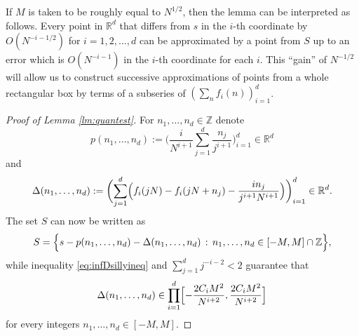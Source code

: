 \documentclass[11pt,letterpaper,reqno]{amsart}
\numberwithin{equation}{section}
\theoremstyle{definition}
\numberwithin{equation}{section}
\begin{document}
If $M$ is taken to be roughly equal to $N^{1/2}$, then the lemma can be interpreted as follows. Every point in $\mathbb{R}^d$ that differs from $s$ in the $i$-th coordinate by $O(N^{-i-1/2})$ for $i=1,2,\ldots,d$ can be approximated by a point from $S$ up to an error which is $O(N^{-i-1})$ in the $i$-th coordinate for each $i$. This ``gain'' of $N^{-1/2}$ will allow us to construct successive approximations of points from a whole rectangular box by terms of a subseries of $(\sum_n f_i(n))_{i=1}^{d}$.

\begin{proof}[Proof of Lemma \ref{lm:quantest}]
For $n_1,\ldots,n_d\in\mathbb{Z}$ denote
\[ p(n_1,\ldots,n_d) := \Big( \frac{i}{N^{i+1}} \sum_{j=1}^{d} \frac{n_j}{j^{i+1}} \Big)_{i=1}^{d} \in \mathbb{R}^d \]
and
\[ \Delta(n_1,\ldots,n_d) := \biggl( \sum_{j=1}^{d} \Bigl( f_i(j N)-f_i(j N + n_j)-\frac{i n_j}{j^{i+1} N^{i+1}} \Bigr) \biggr)_{i=1}^{d} \in \mathbb{R}^d. \]
The set $S$ can now be written as
\[ S = \Bigl\{ s - p(n_1,\ldots,n_d) - \Delta(n_1,\ldots,n_d) \,:\, n_1,\ldots,n_d\in[-M,M]\cap\mathbb{Z} \Bigr\}, \]
while inequality \eqref{eq:infDsillyineq} and $\sum_{j=1}^{d}j^{-i-2}<2$ guarantee that
\begin{equation}\label{eq:deltaQ}
\Delta(n_1,\ldots,n_d) \in \prod_{i=1}^{d} \Bigl[ -\frac{2C_i M^2}{N^{i+2}}, \frac{2C_i M^2}{N^{i+2}} \Bigr]
\end{equation}
for every integers $n_1,\ldots,n_d\in[-M,M]$.


\end{proof}
\end{document}
